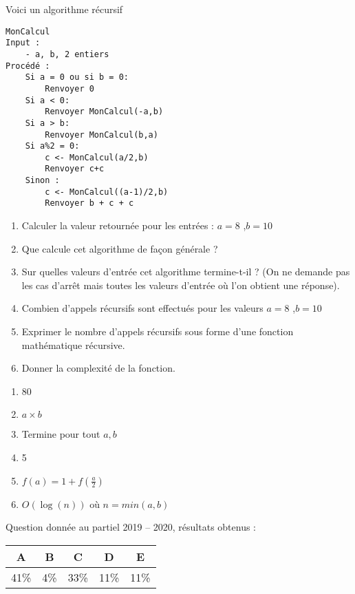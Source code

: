 
\begin{exercice}[2019 -- 2020]
Voici un algorithme récursif

\begin{lstlisting}
MonCalcul
Input :
    - a, b, 2 entiers
Procédé :
    Si a = 0 ou si b = 0:
        Renvoyer 0
    Si a < 0:
        Renvoyer MonCalcul(-a,b)
    Si a > b:
        Renvoyer MonCalcul(b,a)
    Si a%2 = 0:
        c <- MonCalcul(a/2,b)
        Renvoyer c+c
    Sinon :
        c <- MonCalcul((a-1)/2,b)
        Renvoyer b + c + c
\end{lstlisting}

\begin{enumerate}
\item Calculer la valeur retournée pour les entrées : $a = 8$ ,$b = 10$
\item Que calcule cet algorithme de façon générale ?
\item Sur quelles valeurs d'entrée cet algorithme termine-t-il ? (On ne demande pas les cas d'arrêt mais toutes les valeurs d'entrée où l'on obtient une réponse).
\item Combien d'appels récursifs sont effectués pour les valeurs $a = 8$ ,$b = 10$
\item Exprimer le nombre d'appels récursifs sous forme d'une fonction mathématique récursive.
\item Donner la complexité de la fonction.
\end{enumerate}

\begin{correction}
\begin{enumerate}
\item 80
\item $a \times b$
\item Termine pour tout $a,b$
\item 5
\item $f(a) = 1 + f(\frac{a}{2})$ 
\item $O(\log(n))$ où $n = min(a,b)$
\end{enumerate}
\end{correction}

Question donnée au partiel 2019 -- 2020, résultats obtenus :

\begin{tabular}{|c|c|c|c|c|}
\hline
A & B & C & D & E \\ \hline
41\% & 4\% & 33\% & 11\% & 11\% \\ \hline
\end{tabular} 

\end{exercice}